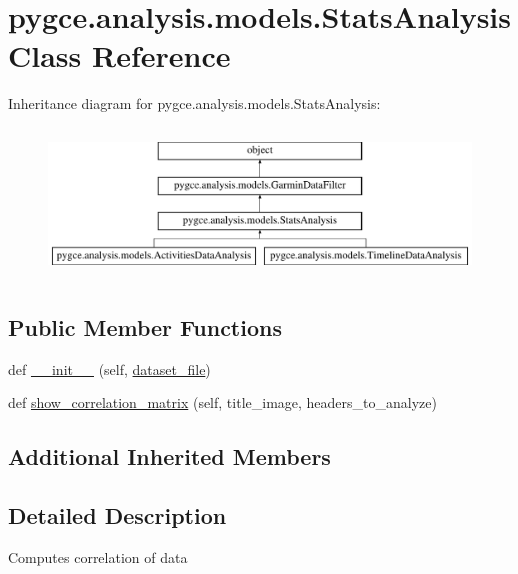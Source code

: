 \hypertarget{classpygce_1_1analysis_1_1models_1_1_stats_analysis}{}\section{pygce.\+analysis.\+models.\+Stats\+Analysis Class Reference}
\label{classpygce_1_1analysis_1_1models_1_1_stats_analysis}
Inheritance diagram for pygce.\+analysis.\+models.\+Stats\+Analysis\+:\begin{figure}[H]
\begin{center}
\leavevmode
\includegraphics[height=4.000000cm]{classpygce_1_1analysis_1_1models_1_1_stats_analysis}
\end{center}
\end{figure}
\subsection*{Public Member Functions}
\begin{DoxyCompactItemize}
\item 
def \hyperlink{classpygce_1_1analysis_1_1models_1_1_stats_analysis_a161706ff9c5a5410356e28a240ea5e29}{\+\_\+\+\_\+init\+\_\+\+\_\+} (self, \hyperlink{classpygce_1_1analysis_1_1models_1_1_garmin_data_filter_a7bb7be05577c2d31546e27823a5d11c5}{dataset\+\_\+file})
\item 
def \hyperlink{classpygce_1_1analysis_1_1models_1_1_stats_analysis_a2dd9052d1133c137c3049c6a425f8722}{show\+\_\+correlation\+\_\+matrix} (self, title\+\_\+image, headers\+\_\+to\+\_\+analyze)
\end{DoxyCompactItemize}
\subsection*{Additional Inherited Members}


\subsection{Detailed Description}
\begin{DoxyVerb}Computes correlation of data\end{DoxyVerb}
 

